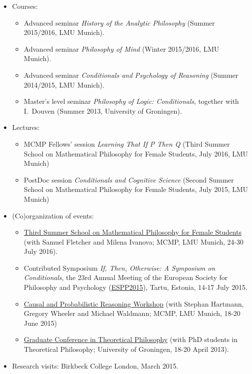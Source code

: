 \documentclass[a4paper,12pt]{article}
\begin{document}
\begin{small}
  
  \begin{itemize}
    \item Courses:
      \begin{itemize}
        \item Advanced seminar \emph{History of the Analytic Philosophy} (Summer 2015/2016, LMU Munich).
        \item Advanced seminar \emph{Philosophy of Mind} (Winter 2015/2016, LMU Munich).
        \item Advanced seminar \emph{Conditionals and Psychology of Reasoning} (Summer 2014/2015, LMU Munich).
        \item Master's level seminar \emph{Philosophy of Logic: Conditionals}, together with I.~Douven (Summer 2013, University of Groningen).
     \end{itemize}
    \item Lectures:
      \begin{itemize}
         \item MCMP Fellows' session \emph{Learning That If P Then Q} (Third Summer School on Mathematical Philosophy for Female Students, July 2016, LMU Munich)
         \item PostDoc session \emph{Conditionals and Cognitive Science} (Second Summer School on Mathematical Philosophy for Female Students, July 2015, LMU Munich)
      \end{itemize}
  \end{itemize}
  


  \begin{itemize}
  	\item (Co)organization of events:
  		\begin{itemize}
		  \item \href{http://www.mathsummer.philosophie.uni-muenchen.de}{Third Summer School on Mathematical Philosophy for Female Students} (with Samuel Fletcher and Milena Ivanova; MCMP, LMU Munich, 24-30 July 2016).
		  \item Contributed Symposium \emph{If, Then, Otherwise: A Symposium on Conditionals}, the 23rd Annual Meeting of the European Society for Philosophy and Psychology (\href{http://espp2015.ut.ee}{ESPP2015}), Tartu, Estonia, 14-17 July 2015.
		  \item \href{http://lmu.de/cpr2015}{Causal and Probabilistic Reasoning Workshop} (with Stephan Hartmann, Gregory Wheeler and Michael Waldmann; MCMP, LMU Munich, 18-20 June 2015)
		  \item  \href{http://www.philos.rug.nl/GCTP2013/}{Graduate Conference in
	      Theoretical Philosophy} (with PhD students in Theoretical Philosophy; University of Groningen, 18-20 April 2013).
  		\end{itemize}
  	\item Research visits: Birkbeck College London, March 2015.


\end{itemize}
\end{small}
\end{document}

